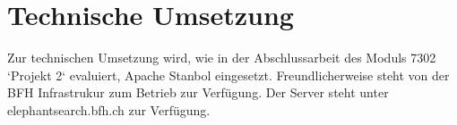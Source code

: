 \chapter{Technische Umsetzung}
\label{chap:technischeUmsetzung}
Zur technischen Umsetzung wird, wie in der Abschlussarbeit des Moduls 7302 `Projekt 2` evaluiert, Apache Stanbol eingesetzt.
Freundlicherweise steht von der BFH Infrastrukur zum Betrieb zur Verfügung. Der Server steht unter elephantsearch.bfh.ch zur Verfügung.
